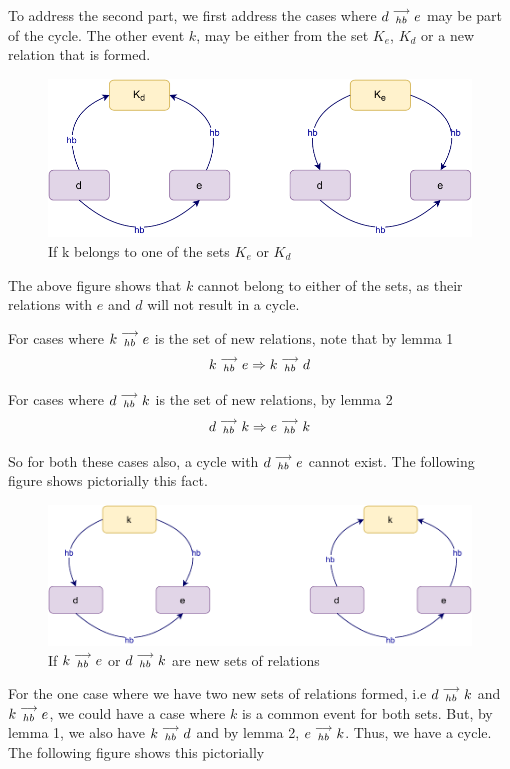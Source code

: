     To address the second part, we first address the cases where $d\stackrel{\longrightarrow}{_{hb}}e$ may be part of the cycle. The other event $k$, may be either from the set $K_e$, $K_d$ or a new relation that is formed.
    \begin{figure}[H]
        \centering
        \includegraphics[scale=0.7]{Q4(a)_1.pdf}
        \caption{If k belongs to one of the sets $K_e$ or $K_d$}
        \label{fig:my_label}
    \end{figure}

    The above figure shows that $k$ cannot belong to either of the sets, as their relations with $e$ and $d$ will not result in a cycle. 

    For cases where $k\stackrel{\longrightarrow}{_{hb}}e$ is the set of new relations, note that by lemma 1
    \[
        k\stackrel{\longrightarrow}{_{hb}}e \Rightarrow k\stackrel{\longrightarrow}{_{hb}}d
    \]

    For cases where $d\stackrel{\longrightarrow}{_{hb}}k$ is the set of new relations, by lemma 2
    \[
        d\stackrel{\longrightarrow}{_{hb}}k \Rightarrow e\stackrel{\longrightarrow}{_{hb}}k
    \]

    So for both these cases also, a cycle with $d\stackrel{\longrightarrow}{_{hb}}e$ cannot exist. The following figure shows pictorially this fact. 
    \begin{figure}[H]
        \centering
        \includegraphics[scale=0.7]{Q4(a)_2.pdf}
        \caption{If $k\stackrel{\longrightarrow}{_{hb}}e$ or $d\stackrel{\longrightarrow}{_{hb}}k$ are new sets of relations}
        \label{fig:my_label}
    \end{figure}


    For the one case where we have two new sets of relations formed, i.e $d\stackrel{\longrightarrow}{_{hb}}k$ and $k\stackrel{\longrightarrow}{_{hb}}e$, we could have a case where $k$ is a common event for both sets. But, by lemma 1, we also have $k\stackrel{\longrightarrow}{_{hb}}d$ and by lemma 2, $e\stackrel{\longrightarrow}{_{hb}}k$. Thus, we have a cycle. The following figure shows this pictorially

